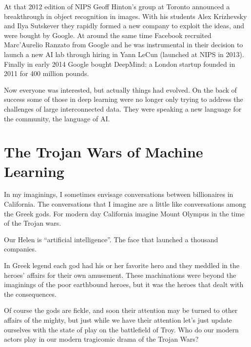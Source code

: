 \documentclass[a4paper]{caesar_book}
\let\oldchapter\chapter
\def\chapter{%
  \setcounter{footnote}{0}%
  \oldchapter
}
\begin{document}
At that 2012 edition of NIPS Geoff Hinton’s group at Toronto announced a breakthrough in object recognition in images. With his students Alex Krizhevsky and Ilya Sutskever they rapidly formed a new company to exploit the ideas, and were bought by Google. At around the same time Facebook recruited Marc’Aurelio Ranzato from Google and he was instrumental in their decision to launch a new AI lab through hiring in Yann LeCun (launched at NIPS in 2013). Finally in early 2014 Google bought DeepMind: a London startup founded in 2011 for 400 million pounds.

Now everyone was interested, but actually things had evolved. On the back of success some of those in deep learning were no longer only trying to address the challenges of large interconnected data. They were speaking a new language for the community, the language of AI.

\chapter{The Trojan Wars of Machine Learning}
In my imaginings, I sometimes envisage conversations between billionaires in California. The conversations that I imagine are a little like conversations among the Greek gods. For modern day California imagine Mount Olympus in the time of the Trojan wars.

Our Helen is ``artificial intelligence''. The face that launched a thousand companies.

In Greek legend each god had his or her favorite hero and they meddled in the heroes’ affairs for their own amusement. These machinations were beyond the imaginings of the poor earthbound heroes, but it was the heroes that dealt with the consequences.

Of course the gods are fickle, and soon their attention may be turned to other affairs of the mighty, but just while we have their attention let’s just update ourselves with the state of play on the battlefield of Troy. Who do our modern actors play in our modern tragicomic drama of the Trojan Wars?
\end{document}
